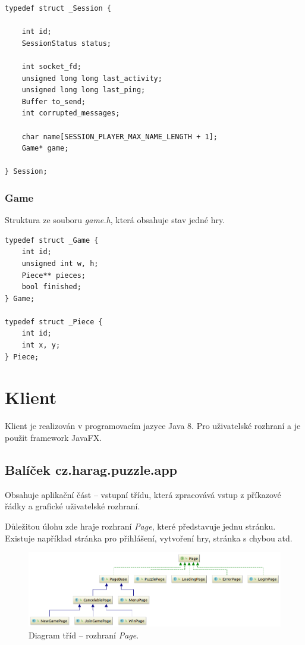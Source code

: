 \documentclass[12pt, a4paper]{report}
\begin{document}
\begin{lstlisting}
typedef struct _Session {

	int id;
	SessionStatus status;
	
	int socket_fd;
	unsigned long long last_activity;
	unsigned long long last_ping;
	Buffer to_send;
	int corrupted_messages;
	
	char name[SESSION_PLAYER_MAX_NAME_LENGTH + 1];
	Game* game;

} Session;
\end{lstlisting}

\subsubsection*{Game}
Struktura ze souboru \emph{game.h}, která obsahuje stav jedné hry.

\begin{lstlisting}
typedef struct _Game {
	int id;
	unsigned int w, h;
	Piece** pieces;
	bool finished;
} Game;

typedef struct _Piece {
	int id;
	int x, y;
} Piece;
\end{lstlisting}

\newpage

\section{Klient}
Klient je realizován v programovacím jazyce Java 8. Pro uživatelské rozhraní a je použit framework JavaFX.


\subsection{Balíček cz.harag.puzzle.app}
Obsahuje aplikační část -- vstupní třídu, která zpracovává vstup z příkazové řádky a grafické uživatelské rozhraní.

Důležitou úlohu zde hraje rozhraní \emph{Page}, které představuje jednu stránku. Existuje například stránka pro přihlášení, vytvoření hry, stránka s chybou atd.

\begin{figure}[H]
	\centering
	\includegraphics[width=1\linewidth]{img-page-h}
	\caption{Diagram tříd -- rozhraní \emph{Page}.}
	\label{fig:img-page-h}
\end{figure}
\end{document}
